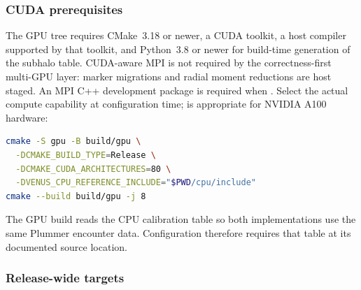 \subsubsection{CUDA prerequisites}

The GPU tree requires CMake~3.18 or newer, a CUDA toolkit, a host compiler
supported by that toolkit, and Python~3.8 or newer for build-time generation of the
subhalo table.  CUDA-aware MPI is not required by the correctness-first
multi-GPU layer: marker migrations and radial moment reductions are host
staged.  An MPI C++ development package is required when
.  Select the actual compute capability at
configuration time;  is appropriate for NVIDIA A100 hardware:
\par\noindent\begin{minipage}{\linewidth}
\begin{lstlisting}[language=bash]
cmake -S gpu -B build/gpu \
  -DCMAKE_BUILD_TYPE=Release \
  -DCMAKE_CUDA_ARCHITECTURES=80 \
  -DVENUS_CPU_REFERENCE_INCLUDE="$PWD/cpu/include"
cmake --build build/gpu -j 8
\end{lstlisting}
\end{minipage}
The GPU build reads the CPU calibration table so both implementations use
the same Plummer encounter data. Configuration therefore requires that table
at its documented source location.

\subsubsection{Release-wide targets}

